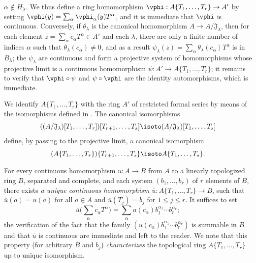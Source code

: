 \begin{env}[7.5.1]
$\alpha\not\in H_\lambda$. We thus define a ring homomorphism
$\vphi:A\{T_1,\dots,T_r\}\to A'$ by setting
$\vphi(y)=\sum_\alpha\vphi_\alpha(y)T^\alpha$, and it is immediate that $\vphi$ is
continuous. Conversely, if $\theta_\lambda$ is the canonical homomorphism
$A\to A/\mathfrak{J}_\lambda$, then for each element
$z=\sum_\alpha c_\alpha T^\alpha\in A'$ and each $\lambda$, there are only a finite
number of indices $\alpha$ such that $\theta_\lambda(c_\alpha)\neq 0$, and as a
result $\psi_\lambda(z)=\sum_\alpha\theta_\lambda(c_\alpha)T^\alpha$ is in
$B_\lambda$; the $\psi_\lambda$ are continuous and form a projective system of
homomorphisms whose projective limit is a continuous homomorphism
$\psi:A'\to A\{T_1,\dots,T_r\}$; it remains to verify that $\vphi\circ\psi$ and
$\psi\circ\vphi$ are the identity automorphisms, which is immediate.
\end{env}

\begin{env}[7.5.2]
\label{0.7.5.2}
We identify $A\{T_1,\dots,T_r\}$ with the ring $A'$ of restricted formal series by
means of the isomorphisms defined in . The canonical
isomorphisms
\[
  ((A/\mathfrak{J}_\lambda)[T_1,\dots,T_r])[T_{r+1},\dots,T_s]
  \isoto(A/\mathfrak{J}_\lambda)[T_1,\dots,T_s]
\]
define, by passing to the projective limit, a canonical isomorphism
\[
  (A\{T_1,\dots,T_r\})\{T_{r+1},\dots,T_s\}
  \isoto A\{T_1,\dots,T_s\}.
\]
\end{env}

\begin{env}[7.5.3]
\label{0.7.5.3}
For every continuous homomorphism $u:A\to B$ from $A$ to a linearly topologized ring
$B$, separated and complete, and each system $(b_1,\dots,b_r)$ of $r$ elements of $B$,
there exists \emph{a unique continuous homomorphism $\overline{u}:A\{T_1,\dots,T_r\}\to B$},
such that $\overline{u}(a)=u(a)$ for all $a\in A$ and $\overline{u}(T_j)=b_j$ for
$1\leq j\leq r$. It suffices to set
\[
  \overline{u}\big(\sum_\alpha c_\alpha T^\alpha\big)
  =\sum_\alpha u(c_\alpha)b_1^{\alpha_1}\cdots b_r^{\alpha_r};
\]
the verification of the fact that the family $(u(c_\alpha)b_1^{\alpha_1}\cdots b_r^{\alpha_r})$
is summable in $B$ and that $\overline{u}$ is continuous are immediate and left to the
reader. We note that this property (for arbitrary $B$ and $b_j$) \emph{characterizes} the
topological ring $A\{T_1,\dots,T_r\}$ up to unique isomorphism.
\end{env}

